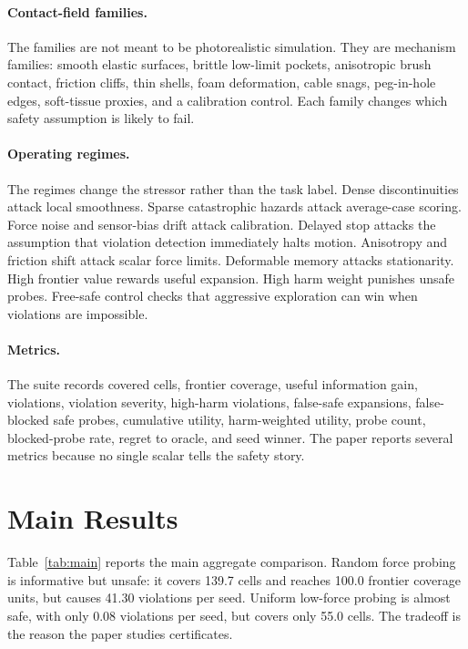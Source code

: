 \documentclass{article}
\begin{document}
\paragraph{Contact-field families.}
The families are not meant to be photorealistic simulation. They are mechanism
families: smooth elastic surfaces, brittle low-limit pockets, anisotropic brush
contact, friction cliffs, thin shells, foam deformation, cable snags,
peg-in-hole edges, soft-tissue proxies, and a calibration control. Each family
changes which safety assumption is likely to fail.

\paragraph{Operating regimes.}
The regimes change the stressor rather than the task label. Dense
discontinuities attack local smoothness. Sparse catastrophic hazards attack
average-case scoring. Force noise and sensor-bias drift attack calibration.
Delayed stop attacks the assumption that violation detection immediately halts
motion. Anisotropy and friction shift attack scalar force limits. Deformable
memory attacks stationarity. High frontier value rewards useful expansion.
High harm weight punishes unsafe probes. Free-safe control checks that
aggressive exploration can win when violations are impossible.

\paragraph{Metrics.}
The suite records covered cells, frontier coverage, useful information gain,
violations, violation severity, high-harm violations, false-safe expansions,
false-blocked safe probes, cumulative utility, harm-weighted utility, probe
count, blocked-probe rate, regret to oracle, and seed winner. The paper reports
several metrics because no single scalar tells the safety story.

\section{Main Results}

Table~\ref{tab:main} reports the main aggregate comparison. Random force probing
is informative but unsafe: it covers 139.7 cells and reaches 100.0 frontier
coverage units, but causes 41.30 violations per seed. Uniform low-force probing
is almost safe, with only 0.08 violations per seed, but covers only 55.0 cells.
The tradeoff is the reason the paper studies certificates.
\end{document}
